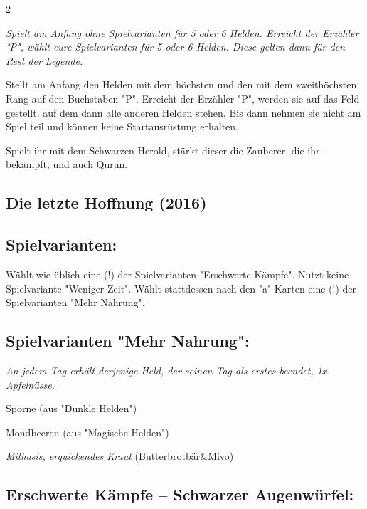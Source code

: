 \documentclass[10pt, a4paper, oneside]{book}
\newcommand{\fan}[1]{\textit{#1}}
\begin{document}
\begin{multicols*}{2}
\begin{bgcolor}
\fan{Spielt am Anfang ohne Spielvarianten für 5 oder 6 Helden. Erreicht der Erzähler "P", wählt eure Spielvarianten für 5 oder 6 Helden. Diese gelten dann für den Rest der Legende.}

Stellt am Anfang den Helden mit dem höchsten und den mit dem zweithöchsten Rang auf den Buchstaben "P". Erreicht der Erzähler "P", werden sie auf das Feld gestellt, auf dem dann alle anderen Helden stehen. Bis dann nehmen sie nicht am Spiel teil und können keine Startausrüstung erhalten.
\supercite{dridn10-5-6}


Spielt ihr mit dem Schwarzen Herold, stärkt dieser die Zauberer, die ihr bekämpft, und auch Qurun.
\supercite{dridn-begleitheft}

\end{bgcolor}


\columnbreak

\begin{bgcolor}
\section{Die letzte Hoffnung (2016)}


\subsection{Spielvarianten:}

Wählt wie üblich eine (!) der Spielvarianten "Erschwerte Kämpfe".
Nutzt keine Spielvariante "Weniger Zeit". Wählt stattdessen nach den "a"-Karten eine (!) der Spielvarianten "Mehr Nahrung".


\subsection{Spielvarianten "Mehr Nahrung":}

\bullet{} \fan{An jedem Tag erhält derjenige Held, der seinen Tag als erstes beendet, 1x Apfelnüsse.}

\bullet{} Sporne (aus "Dunkle Helden")
\supercite{dh-sporne,dh17-a0-5-6}

\bullet{} Mondbeeren (aus "Magische Helden")
\supercite{mh-mondbeeren,mh-begleitheft}

\href{https://legenden-von-andor.de/forum/viewtopic.php?p=132952#p132952}
{\blacktriangleright \fan{Mithasis, erquickendes Kraut} (Butterbrotbär\&Mivo)}




\subsection{Erschwerte Kämpfe – Schwarzer Augenwürfel:}


\end{bgcolor}
\end{multicols*}
\end{document}
